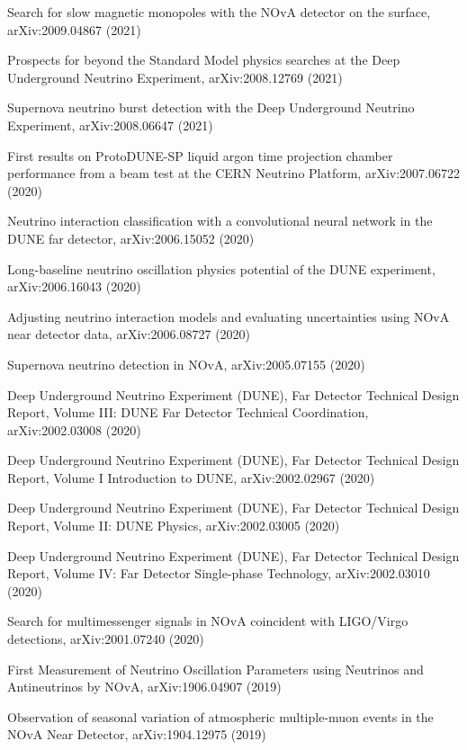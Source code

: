 \begin{list2}
\item Search for slow magnetic monopoles with the NOvA detector on the surface, arXiv:2009.04867 (2021) %
\item Prospects for beyond the Standard Model physics searches at the Deep Underground Neutrino Experiment, arXiv:2008.12769 (2021) %
\item Supernova neutrino burst detection with the Deep Underground Neutrino Experiment, arXiv:2008.06647 (2021) %
\item First results on ProtoDUNE-SP liquid argon time projection chamber performance from a beam test at the CERN Neutrino Platform, arXiv:2007.06722 (2020) %
\item Neutrino interaction classification with a convolutional neural network in the DUNE far detector, arXiv:2006.15052 (2020) %
\item Long-baseline neutrino oscillation physics potential of the DUNE experiment, arXiv:2006.16043 (2020) %
\item Adjusting neutrino interaction models and evaluating uncertainties using NOvA near detector data, arXiv:2006.08727 (2020) %
\item Supernova neutrino detection in NOvA, arXiv:2005.07155 (2020) %
\item Deep Underground Neutrino Experiment (DUNE), Far Detector Technical Design Report, Volume III: DUNE Far Detector Technical Coordination, arXiv:2002.03008 (2020) %
\item Deep Underground Neutrino Experiment (DUNE), Far Detector Technical Design Report, Volume I Introduction to DUNE, arXiv:2002.02967 (2020) %
\item Deep Underground Neutrino Experiment (DUNE), Far Detector Technical Design Report, Volume II: DUNE Physics, arXiv:2002.03005 (2020) %
\item Deep Underground Neutrino Experiment (DUNE), Far Detector Technical Design Report, Volume IV: Far Detector Single-phase Technology, arXiv:2002.03010 (2020) %
\item Search for multimessenger signals in NOvA coincident with LIGO/Virgo detections, arXiv:2001.07240 (2020) %
\item First Measurement of Neutrino Oscillation Parameters using Neutrinos and Antineutrinos by NOvA, arXiv:1906.04907 (2019) %
\item Observation of seasonal variation of atmospheric multiple-muon events in the NOvA Near Detector, arXiv:1904.12975 (2019) %

\end{list2}
